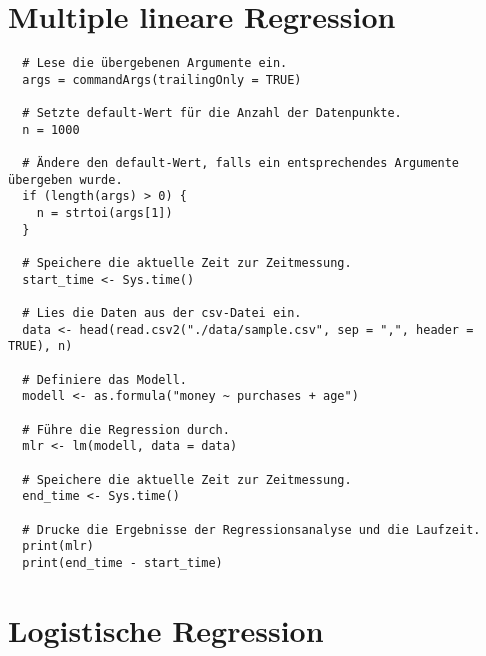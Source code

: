 \section{Multiple lineare Regression}
\label{appendix:B:2}

\begin{verbatim}
  # Lese die übergebenen Argumente ein.
  args = commandArgs(trailingOnly = TRUE)

  # Setzte default-Wert für die Anzahl der Datenpunkte.
  n = 1000

  # Ändere den default-Wert, falls ein entsprechendes Argumente übergeben wurde.
  if (length(args) > 0) {
    n = strtoi(args[1])
  }

  # Speichere die aktuelle Zeit zur Zeitmessung.
  start_time <- Sys.time()

  # Lies die Daten aus der csv-Datei ein.
  data <- head(read.csv2("./data/sample.csv", sep = ",", header = TRUE), n)

  # Definiere das Modell.
  modell <- as.formula("money ~ purchases + age")

  # Führe die Regression durch.
  mlr <- lm(modell, data = data)

  # Speichere die aktuelle Zeit zur Zeitmessung.
  end_time <- Sys.time()

  # Drucke die Ergebnisse der Regressionsanalyse und die Laufzeit.
  print(mlr)
  print(end_time - start_time)
\end{verbatim}

\section{Logistische Regression}
\label{appendix:B:3}

